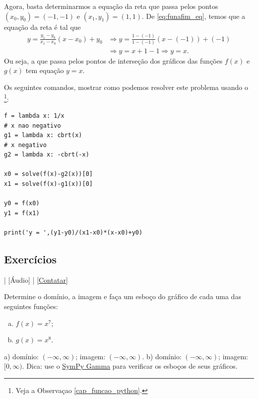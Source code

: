 \begin{resol}
  Agora, basta determinarmos a equação da reta que passa pelos pontos $(x_0, y_0) = (-1, -1)$ e $(x_1, y_1) = (1, 1)$. De \eqref{eq:funafim_eq}, temos que a equação da reta é tal que
  \begin{align}
    y = \frac{y_1-y_0}{x_1-x_0}(x-x_0)+y_0 &\Rightarrow y = \frac{1-(-1)}{1-(-1)}(x-(-1))+(-1)\\
                                           &\Rightarrow y = x+1-1 \Rightarrow y = x.
  \end{align}
  Ou seja, a que passa pelos pontos de interseção dos gráficos das funções $f(x)$ e $g(x)$ tem equação $y = x$.

  \ifispython
  Os seguintes comandos, mostrar como podemos resolver este problema usando o \sympy\footnote{Veja a Observaçao \ref{cap_funcao_python}.}:
\begin{verbatim}
f = lambda x: 1/x
# x nao negativo
g1 = lambda x: cbrt(x)
# x negativo
g2 = lambda x: -cbrt(-x)

x0 = solve(f(x)-g2(x))[0]
x1 = solve(f(x)-g1(x))[0]

y0 = f(x0)
y1 = f(x1)

print('y = ',(y1-y0)/(x1-x0)*(x-x0)+y0)
\end{verbatim}
  \fi
\end{resol}

\subsection*{Exercícios}

\begin{flushright}
  [Vídeo] | [Áudio] | \href{https://phkonzen.github.io/notas/contato.html}{[Contatar]}
\end{flushright}

\begin{exer}
  Determine o domínio, a imagem e faça um esboço do gráfico de cada uma das seguintes funções:
  \begin{enumerate}[a)]
  \item $f(x) = x^7$;
  \item $g(x) = x^8$.
  \end{enumerate}
\end{exer}
\begin{resp}
  a) domínio: $(-\infty, \infty)$; imagem: $(-\infty, \infty)$. b) domínio: $(-\infty, \infty)$; imagem: $[0, \infty)$. Dica: use o \href{https://www.sympygamma.com/}{SymPy Gamma} para verificar os esboços de seus gráficos.
\end{resp}

